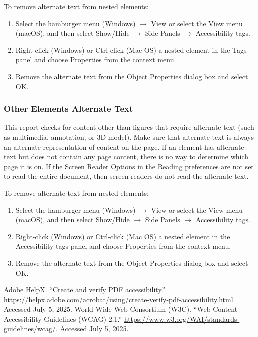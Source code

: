 To remove alternate text from nested elements:
\begin{enumerate}
    \item Select the hamburger menu (Windows) $\rightarrow$ View or select the View menu (macOS), and then select Show/Hide $\rightarrow$ Side Panels $\rightarrow$ Accessibility tags.
    \item Right-click (Windows) or Ctrl-click (Mac OS) a nested element in the Tags panel and choose Properties from the context menu.
    \item Remove the alternate text from the Object Properties dialog box and select OK.
\end{enumerate}

\subsubsection{Other Elements Alternate Text}
\label{subsubsec:acrobat-other-elements-alt-text}
This report checks for content other than figures that require alternate text (such as multimedia, annotation, or 3D model). Make sure that alternate text is always an alternate representation of content on the page. If an element has alternate text but does not contain any page content, there is no way to determine which page it is on. If the Screen Reader Options in the Reading preferences are not set to read the entire document, then screen readers do not read the alternate text.\ \cite{WCAG}

To remove alternate text from nested elements:
\begin{enumerate}
    \item Select the hamburger menu (Windows) $\rightarrow$ View or select the View menu (macOS), and then select Show/Hide $\rightarrow$ Side Panels $\rightarrow$ Accessibility tags.
    \item Right-click (Windows) or Ctrl-click (Mac OS) a nested element in the Accessibility tags panel and choose Properties from the context menu.
    \item Remove the alternate text from the Object Properties dialog box and select OK.
\end{enumerate}

\begin{thebibliography}{99}
 Adobe HelpX. ``Create and verify PDF accessibility.'' \url{https://helpx.adobe.com/acrobat/using/create-verify-pdf-accessibility.html}. Accessed July 5, 2025.
 World Wide Web Consortium (W3C). ``Web Content Accessibility Guidelines (WCAG) 2.1.'' \url{https://www.w3.org/WAI/standards-guidelines/wcag/}. Accessed July 5, 2025.
\end{thebibliography}
